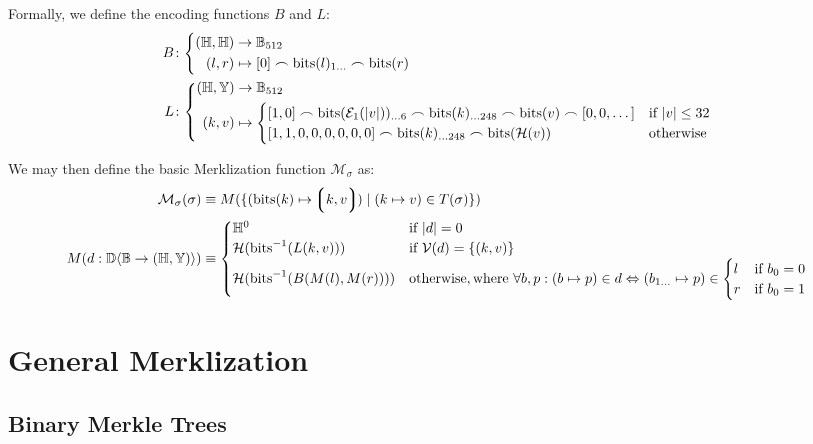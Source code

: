 Formally, we define the encoding functions $B$ and $L$:
\begin{align}
  B&\colon\left\{\begin{aligned}
    (\H, \H) &\to \mathbb{B}_{512}\\
    (l, r) &\mapsto [0] \frown \text{bits}(l)_{1\dots} \frown \text{bits}(r)
  \end{aligned}\right.\\
  L&\colon\left\{\begin{aligned}
    (\H, \Y) &\to \mathbb{B}_{512}\\
    (k, v) &\mapsto \begin{cases}
      [1, 0] \frown \text{bits}(\se_1(|v|))_{\dots6} \frown \text{bits}(k)_{\dots248} \frown \text{bits}(v) \frown [0, 0, \dots] &\when |v| \le 32\\
      [1, 1, 0, 0, 0, 0, 0, 0] \frown \text{bits}(k)_{\dots248} \frown \text{bits}(\mathcal{H}(v)) &\otherwise
    \end{cases}
  \end{aligned}\right.
\end{align}

We may then define the basic Merklization function $\mathcal{M}_\sigma$ as:
\begin{align}
  \mathcal{M}_\sigma(\sigma) &\equiv M(\{ (\text{bits}(k) \mapsto \tup{k, v}) \mid (k \mapsto v) \in T(\sigma) \})\\
  M(d: \dict{\mathbb{B}}{(\H, \Y)}) &\equiv \begin{cases}
    \H^0 &\when |d| = 0\\
    \mathcal{H}(\text{bits}^{-1}(L(k, v))) &\when \mathcal{V}(d) = \{ (k, v) \}\\
    \mathcal{H}(\text{bits}^{-1}(B(M(l), M(r)))) &\otherwise, \where \forall b, p: (b \mapsto p) \in d \Leftrightarrow (b_{1\dots} \mapsto p) \in \begin{cases}
      l &\when b_0 = 0 \\
      r &\when b_0 = 1
    \end{cases}
  \end{cases}
\end{align}

\section{General Merklization}\label{sec:merklization}

\subsection{Binary Merkle Trees}

